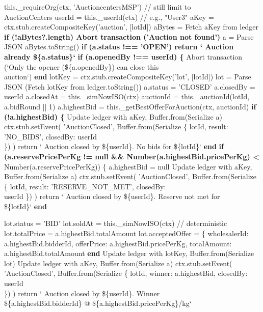 \documentclass[12pt]{article}
\begin{document}
\begin{algorithm}[H]
\caption{closeAuction() (Part 1 of 2)}
this.\_requireOrg(ctx, 'AuctioncentersMSP') // still limit to\\
\quad AuctionCenters\;
userId = this.\_userId(ctx)           // e.g., "User3"\;
aKey = ctx.stub.createCompositeKey('auction', [lotId])\;
aBytes = Fetch aKey from ledger\;
\textbf{if (!aBytes?.length) Abort transaction ('Auction not found')}\;
a = Parse JSON aBytes.toString()\;
\textbf{if (a.status !== 'OPEN') return ` Auction already \$\{a.status\}`}\;
\textbf{if (a.openedBy !== userId) \{}\;
Abort transaction (`Only the opener (\$\{a.openedBy\}) can close this\\
\quad auction`)\;
\textbf{end}\;
lotKey = ctx.stub.createCompositeKey('lot', [lotId])\;
lot = Parse JSON (Fetch lotKey from ledger.toString())\;
a.status = 'CLOSED'\;
a.closedBy = userId\;
a.closedAt = this.\_simNowISO(ctx)\;
auctionId = this.\_auctionId(lotId, a.bidRound || 1)\;
a.highestBid = this.\_getBestOfferForAuction(ctx, auctionId)\;
\textbf{if (!a.highestBid) \{}\;
Update ledger with aKey, Buffer.from(Serialize a)\;
ctx.stub.setEvent(\;
'AuctionClosed',\;
Buffer.from(Serialize \{ lotId, result: 'NO\_BIDS', closedBy: userId\\
\quad \})\;
)\;
return ` Auction closed by \$\{userId\}. No bids for \$\{lotId\}`\;
\textbf{end}\;
\textbf{if (a.reservePricePerKg != null \&\& Number(a.highestBid.pricePerKg) <}\\
\quad Number(a.reservePricePerKg)) \{\;
a.highestBid = null\;
Update ledger with aKey, Buffer.from(Serialize a)\;
ctx.stub.setEvent(\;
'AuctionClosed',\;
Buffer.from(Serialize \{ lotId, result: 'RESERVE\_NOT\_MET', closedBy:\\
\quad userId \})\;
)\;
return ` Auction closed by \$\{userId\}. Reserve not met for\\
\quad \$\{lotId\}`\;
\textbf{end}\;
\end{algorithm}


\begin{algorithm}[H]
\caption{closeAuction() (Part 2 of 2)}
lot.status = 'BID'\;
lot.soldAt = this.\_simNowISO(ctx) // deterministic\;
lot.totalPrice = a.highestBid.totalAmount\;
lot.acceptedOffer = \{\;
wholesalerId: a.highestBid.bidderId,\;
offerPrice: a.highestBid.pricePerKg,\;
totalAmount: a.highestBid.totalAmount\;
\textbf{end}\;
Update ledger with lotKey, Buffer.from(Serialize lot)\;
Update ledger with aKey,  Buffer.from(Serialize a)\;
ctx.stub.setEvent(\;
'AuctionClosed',\;
Buffer.from(Serialize \{ lotId, winner: a.highestBid, closedBy: userId\\
\quad \})\;
)\;
return ` Auction closed by \$\{userId\}. Winner\\
\quad \$\{a.highestBid.bidderId\} @ \$\{a.highestBid.pricePerKg\}/kg`\;
\end{algorithm}
\end{document}
